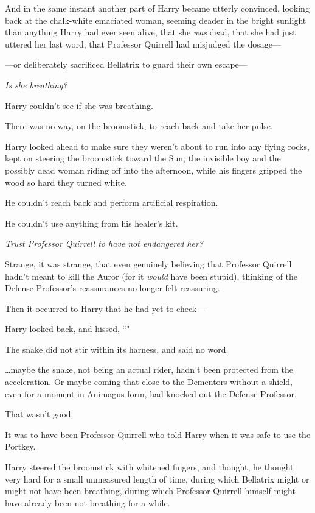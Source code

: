 And in the same instant another part of Harry became utterly convinced, looking back at the chalk-white emaciated woman, seeming deader in the bright sunlight than anything Harry had ever seen alive, that she \emph{was} dead, that she had just uttered her last word, that Professor Quirrell had misjudged the dosage---

---or deliberately sacrificed Bellatrix to guard their own escape---

\emph{Is she breathing?}

Harry couldn't see if she was breathing.

There was no way, on the broomstick, to reach back and take her pulse.

Harry looked ahead to make sure they weren't about to run into any flying rocks, kept on steering the broomstick toward the Sun, the invisible boy and the possibly dead woman riding off into the afternoon, while his fingers gripped the wood so hard they turned white.

He couldn't reach back and perform artificial respiration.

He couldn't use anything from his healer's kit.

\emph{Trust Professor Quirrell to have not endangered her?}

Strange, it was strange, that even genuinely believing that Professor Quirrell hadn't meant to kill the Auror (for it \emph{would} have been stupid), thinking of the Defense Professor's reassurances no longer felt reassuring.

Then it occurred to Harry that he had yet to check---

Harry looked back, and hissed, ``"

The snake did not stir within its harness, and said no word.

{\ldots}maybe the snake, not being an actual rider, hadn't been protected from the acceleration. Or maybe coming that close to the Dementors without a shield, even for a moment in Animagus form, had knocked out the Defense Professor.

That wasn't good.

It was to have been Professor Quirrell who told Harry when it was safe to use the Portkey.

Harry steered the broomstick with whitened fingers, and thought, he thought very hard for a small unmeasured length of time, during which Bellatrix might or might not have been breathing, during which Professor Quirrell himself might have already been not-breathing for a while.

